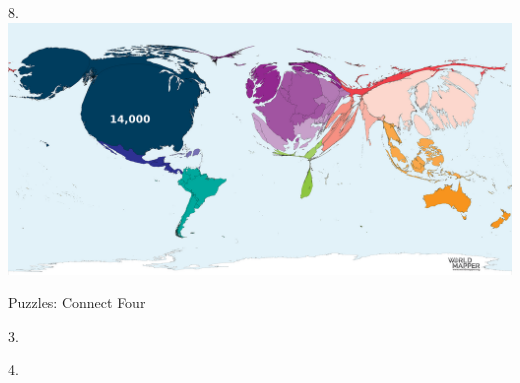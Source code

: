 \begin{frame}
\begin{center}
\Large
8. 
\\
\vspace{0.5em}\includegraphics[height=0.6\paperheight]{maps/picture_8.png}
\\
\end{center}
\end{frame}
\begin{frame}
\begin{center}
\Huge
Puzzles: Connect Four
\end{center}
\end{frame}
\begin{frame}

\end{frame}
\begin{frame}

\end{frame}
\begin{frame}
\begin{center}
\Large
3. 
\end{center}
\end{frame}
\begin{frame}
\begin{center}
\Large
4. 
\end{center}
\end{frame}
